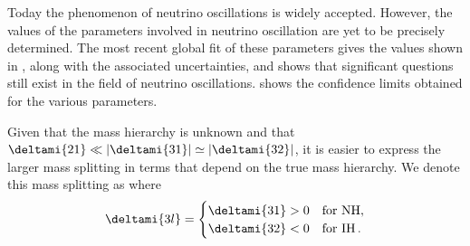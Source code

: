 
Today the phenomenon of neutrino oscillations is widely accepted. 
However, the values of the parameters involved in neutrino oscillation are yet to be precisely determined.
The most recent global fit of these parameters gives the values shown in , along with the associated uncertainties, and shows that significant questions still exist in the field of neutrino oscillations.
 shows the confidence limits obtained for the various parameters.

Given that the mass hierarchy is unknown and that $\deltami{21} \ll |\deltami{31}| \simeq |\deltami{32}|$, it is easier to express the larger mass splitting in terms that depend on the true mass hierarchy.
We denote this mass splitting as  where
\begin{equation}
  \deltami{3l} =
  \begin{cases}
    \deltami{31} > 0 & \text{for NH} , \\
    \deltami{32} < 0 & \text{for IH} \, .
  \end{cases}
\end{equation}

